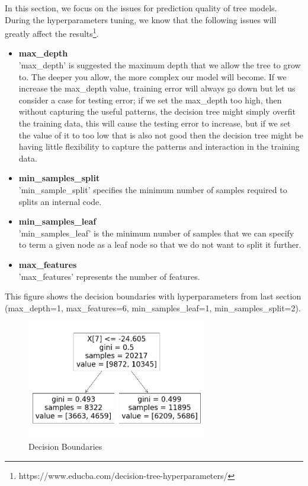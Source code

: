 \documentclass[UTF8]{ctexart}
\begin{document}
In this section, we focus on the issues for prediction quality of tree models. During the hyperparameters tuning, we know that the following issues will greatly affect the results\footnote{https://www.educba.com/decision-tree-hyperparameters/}.

\begin{itemize}
	\item \textbf{max\_depth}            \\
	      'max\_depth' is suggested the maximum depth that we allow the tree to grow to. The deeper you allow, the more complex our model will become. If we increase the max\_depth value, training error will always go down but let us consider a case for testing error; if we set the max\_depth too high, then without capturing the useful patterns, the decision tree might simply overfit the training data, this will cause the testing error to increase, but if we set the value of it to too low that is also not good then the decision tree might be having little flexibility to capture the patterns and interaction in the training data.

	\item \textbf{min\_samples\_split}   \\
	      'min\_sample\_split' specifies the minimum number of samples required to splits an internal code.

	\item \textbf{min\_samples\_leaf}    \\
	      'min\_samples\_leaf' is the minimum number of samples that we can specify to term a given node as a leaf node so that we do not want to split it further.

	\item \textbf{max\_features}         \\
	      'max\_features' represents the number of features.

\end{itemize}

This figure shows the decision boundaries with hyperparameters from last section (max\_depth=1, max\_features=6, min\_samples\_leaf=1, min\_samples\_split=2).

\begin{figure}[H]
	\centerline{\includegraphics[width=0.70\textwidth]{decision_boundaries.png}}
	\caption{Decision Boundaries}
\end{figure}
\end{document}
